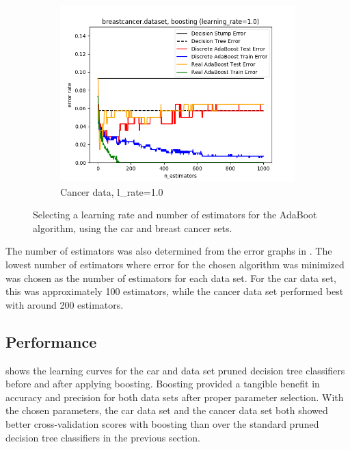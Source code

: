 \documentclass{article}
\begin{document}
\begin{figure}[htb]
\begin{subfigure}{0.33\textwidth}
      \includegraphics[width=\linewidth]{out/boosting/breastcancer-error-lrate-1.0.png}
      \caption{Cancer data, l\_rate=1.0}
      \label{fig:boosting-param-6}
    \end{subfigure}

    \caption{Selecting a learning rate and number of estimators for the AdaBoot algorithm, using the car and breast cancer sets.}
    \label{fig:boosting-param}
    \end{figure}

    The number of estimators was also determined from the error graphs in . The lowest number of estimators where error for the chosen algorithm was minimized was chosen as the number of estimators for each data set. For the car data set, this was approximately 100 estimators, while the cancer data set performed best with around 200 estimators.

    \subsection{Performance}
     shows the learning curves for the car and data set pruned decision tree classifiers before and after applying boosting. Boosting provided a tangible benefit in accuracy and precision for both data sets after proper parameter selection. With the chosen parameters, the car data set and the cancer data set both showed better cross-validation scores with boosting than over the standard pruned decision tree classifiers in the previous section.
\end{document}
